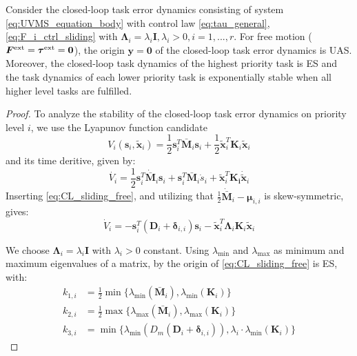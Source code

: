 \documentclass[../main.tex]{subfiles}
\begin{document}
\begin{theorem}
    \label{thm:stability_sliding}
    Consider the closed-loop task error dynamics consisting of system \eqref{eq:UVMS_equation_body} with control law \eqref{eq:tau_general}, \eqref{eq:F_i_ctrl_sliding} with $\bm{\Lambda}_i=\lambda_i \bm{I}, \lambda_i > 0, i=1,...,r$. For free motion ($\bm{F}^{\rm ext}=\bm{\tau}^{\rm ext} = \bm{0}$), the origin $\bm{y} = \bm{0}$ of the closed-loop task error dynamics is UAS. Moreover, the closed-loop task dynamics of the highest priority task is ES and the task dynamics of each lower priority task is exponentially stable when all higher level tasks are fulfilled.
\end{theorem}
\begin{proof}
    \label{prf:stability_sliding}
    To analyze the stability of the closed-loop task error dynamics on  priority level $i$, we use the Lyapunov function candidate
    \begin{equation}\label{eq:Vi}
        V_i(\bm{s}_i,\tilde{\bm{x}}_i) = \frac{1}{2}\bm{s}_i^T \bar{\bm{M}}_i \bm{s}_i + \frac{1}{2}\tilde{\bm{x}}_i ^T \bm{K}_i \tilde{\bm{x}}_i
    \end{equation}
    and its time deritive, given by:
    \begin{equation}
        \label{eq:V_dot_unsolved}
        \dot{V_i} = \frac{1}{2}\bm{s}_i^T \dot{\bar{\bm{M}}}_i \bm{s}_i + \bm{s}_i^T \bar{\bm{M}}_i\dot{s}_i
        + \tilde{\bm{x}}_i^T \bm{K_i} \dot{\tilde{\bm{x}}}_i
    \end{equation}
    Inserting \eqref{eq:CL_sliding_free}, and utilizing that $\frac{1}{2} \dot{\bar{\bm{M}}}_i - \bm{\mu}_{i,i}$ is skew-symmetric, gives: %
    \begin{equation}
        \label{eq:Vi_dot}
        \dot{V}_{i} =
        -\bm{s}_i^T (\bm{D}_i + \bm{\delta}_{i,i}) \bm{s}_i
        - \tilde{\bm{x}}_i^T \bm{\Lambda}_i \bm{K}_i \tilde{\bm{x}}_i
    \end{equation}

    We choose $\bm{\Lambda}_i=\lambda_i \bm{I}$ with $\lambda_i > 0$ constant. Using $\lambda_{\min}$ and $\lambda_{\max}$ as minimum and maximum eigenvalues of a matrix, by \cite[Theorem 4.10]{Khalil2002} the origin of \eqref{eq:CL_sliding_free} is ES, with:
    \begin{subequations}
        \label{eq:k_i}
        \begin{align}
            k_{1,i} &= \frac{1}{2}\min\{\lambda_{\min}(\bar{\bm{M}}_i),\lambda_{\min}(\bm{K}_i)\} \\
            k_{2,i} &= \frac{1}{2}\max\{\lambda_{\max}(\bar{\bm{M}}_i),\lambda_{\max}(\bm{K}_i)\} \\
            k_{3,i} &= \min\{\lambda_{\min}(D_m(\bm{D}_i + \bm{\delta}_{i,i})),\lambda_i \cdot \lambda_{\min}(\bm{K}_i)\}
        \end{align}
    \end{subequations}



\end{proof}
\end{document}
